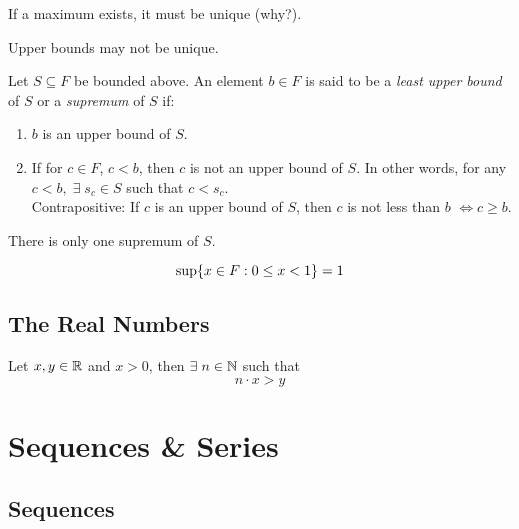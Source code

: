 \documentclass[12pt]{article}
\begin{document}
\begin{rem}
    If a maximum exists, it must be unique (\textcolor{red!85!black}{why?}).
\end{rem}

\begin{rem}
    Upper bounds may not be unique.
\end{rem}

\begin{defn} \label{defn:supremum}
    Let $S \subseteq F$ be bounded above. An element $b \in F$ is said to be a \emph{least upper bound} of $S$ or a \emph{supremum} of $S$ if:
    \begin{enumerate}[label=(\alph*)]
        \item $b$ is an upper bound of $S$.
        \item If for $c \in F$, $c < b$, then $c$ is not an upper bound of $S$. In other words, for any $c < b, \;\exists\; s_{c} \in S$ such that $c < s_{c}$. \\
        Contrapositive: If $c$ is an upper bound of $S$, then $c$ is not less than $b$ $\iff c \geq b$.
    \end{enumerate}
\end{defn}

\begin{rem}
    There is only one supremum of $S$.
\end{rem}

\begin{example}
    \[
        \sup \set{x \in F : 0 \leq x < 1 } = 1
    \]
\end{example}

\subsection{The Real Numbers}

\begin{thm} \label{thm:archimedean}
    Let $x, y \in \mathbb{R}$ and $x > 0$, then $\exists\; n \in \mathbb{N}$ such that \[
        n \cdot x > y
    \]
\end{thm}

\section{Sequences \& Series}

\subsection{Sequences}
\end{document}
